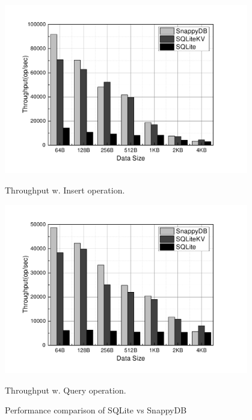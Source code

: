 \begin{figure}
	\centering
	\begin{minipage}[t]{0.4\textwidth}
		\centering
		\includegraphics[width=0.95\textwidth]{Ext/workload1.pdf}
		\vspace*{-0.2cm}
		\caption{\small Throughput w. Insert operation.}
		\label{fig:mov_insert}
	\end{minipage}%
	\hspace*{0.7cm}
	\vspace{0.2cm}
	\begin{minipage}[t]{0.4\textwidth}
		\centering
		\includegraphics[width=0.95\textwidth]{Ext/workload2.pdf}
		\vspace*{-0.2cm}
		\caption{\small Throughput w. Query operation.}
		\label{fig:mov_query}
	\end{minipage}
	\vspace{0.2cm}
	\caption{\small Performance comparison of SQLite vs SnappyDB}
	\label{fig:motivation}
	\vspace*{-0.3cm}
\end{figure}


